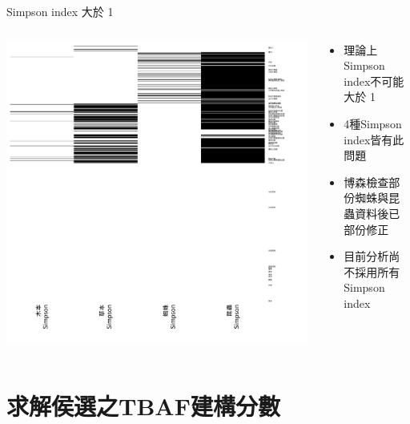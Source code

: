 \documentclass[10pt, aspectratio=1610, xcolor=table]{beamer}
\begin{document}
\begin{frame}{Simpson index 大於 1}
\begin{columns}[onlytextwidth, c]
	\begin{column}{0.55\textwidth}
	\includegraphics[trim=25 25 25 25, width=1\textwidth]{invalid-bio-simpson.png}
	\end{column}
	\begin{column}{0.45\textwidth}
		\begin{itemize}
			\item 理論上Simpson index不可能大於 1
			\item 4種Simpson index皆有此問題
			\item 博森檢查部份蜘蛛與昆蟲資料後已部份修正
			\item 目前分析尚不採用所有Simpson index
		\end{itemize}
	\end{column}
\end{columns}
\end{frame}


\section{求解侯選之TBAF建構分數}
\end{document}
